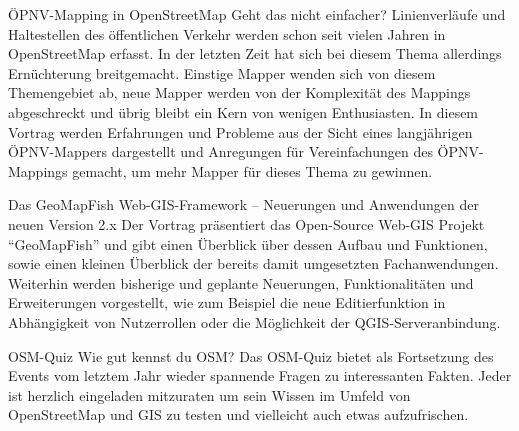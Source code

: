 %
{ÖPNV-Mapping in OpenStreetMap}%
{Geht das nicht einfacher?}%
{Linienverläufe und Haltestellen des öffentlichen Verkehr werden schon seit vielen Jahren in
OpenStreetMap erfasst. In der letzten Zeit hat sich bei diesem Thema allerdings Ernüchterung
breitgemacht. Einstige Mapper wenden sich von diesem Themengebiet ab, neue Mapper werden von der
Komplexität des Mappings abgeschreckt und übrig bleibt ein Kern von wenigen Enthusiasten. In diesem
Vortrag werden Erfahrungen und Probleme aus der Sicht eines langjährigen ÖPNV-Mappers dargestellt
und Anregungen für Vereinfachungen des ÖPNV-Mappings gemacht, um mehr Mapper für dieses Thema zu
gewinnen.}

%
{Das GeoMapFish Web-GIS-Framework – Neuerungen und Anwendungen der neuen Version 2.x}%
{}%
{Der Vortrag präsentiert das Open-Source Web-GIS Projekt “GeoMapFish” und gibt einen Überblick über
dessen Aufbau und Funktionen, sowie einen kleinen Überblick der bereits damit umgesetzten
Fachanwendungen. Weiterhin werden bisherige und geplante Neuerungen, Funktionalitäten und
Erweiterungen vorgestellt, wie zum Beispiel die neue Editierfunktion in Abhängigkeit von
Nutzerrollen oder die Möglichkeit der QGIS-Serveranbindung.}


%
{OSM-Quiz}%
{Wie gut kennst du OSM?}%
{Das OSM-Quiz bietet als Fortsetzung des Events vom letztem Jahr wieder spannende Fragen zu
interessanten Fakten. Jeder ist herzlich eingeladen mitzuraten um sein Wissen im Umfeld von
OpenStreetMap und GIS zu testen und vielleicht auch etwas aufzufrischen.}

